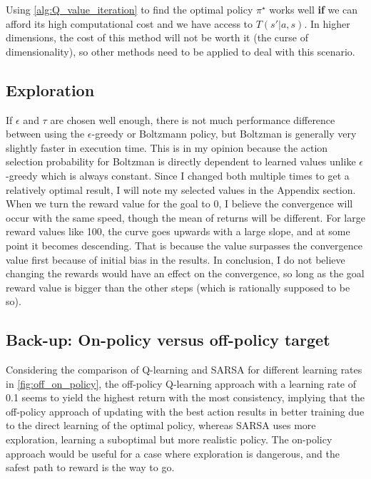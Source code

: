 \documentclass{article}
\theoremstyle{plain}
\theoremstyle{definition}
\theoremstyle{remark}
\begin{document}
Using \autoref{alg:Q_value_iteration} to find the optimal policy $\pi^\star$ works well \textbf{if} we can afford its high computational cost and we have access to $T(s'|a,s)$. In higher dimensions, the cost of this method will not be worth it (the curse of dimensionality), so other methods need to be applied to deal with this scenario.


\subsection{Exploration}\label{subsec:discussion_exploration}
 If $\epsilon$ and $\tau$ are chosen well enough, there is not much performance difference between using the $\epsilon$-greedy or Boltzmann policy, but Boltzman is generally very slightly faster in execution time. This is in my opinion because the action selection probability for Boltzman is directly dependent to learned values unlike $\epsilon$-greedy which is always constant.
 Since I changed both multiple times to get a relatively optimal result, I will note my selected values in the Appendix section.
When we turn the reward value for the goal to 0, I believe the convergence will occur with the same speed, though the mean of returns will be different. For large reward values like 100, the curve goes upwards with a large slope, and at some point it becomes descending. That is because the value surpasses the convergence value first because of initial bias in the results. 
In conclusion, I do not believe changing the rewards would have an effect on the convergence, so long as the goal reward value is bigger than the other steps (which is rationally supposed to be so).

\subsection{ Back-up: On-policy versus off-policy target}\label{subsec:discussion_backup_on_off}

Considering the comparison of Q-learning and SARSA for different learning rates in \autoref{fig:off_on_policy}, the off-policy Q-learning approach with a learning rate of 0.1 seems to yield the highest return with the most consistency, implying that the off-policy approach of updating with the best action results in better training due to the direct learning of the optimal policy, whereas SARSA uses more exploration, learning a suboptimal but more realistic policy. The on-policy approach would be useful for a case where exploration is dangerous, and the safest path to reward is the way to go.
\end{document}
